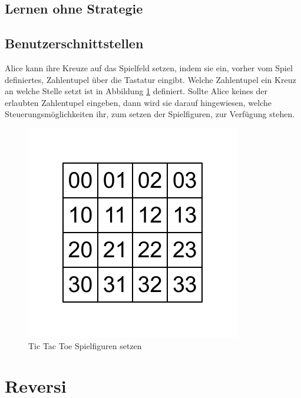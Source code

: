 


\subsection{Lernen ohne Strategie}
\label{subsec:Lernen ohne Strategie}

\subsection{Benutzerschnittstellen}

Alice kann ihre Kreuze auf das Spielfeld setzen, indem sie ein, vorher vom Spiel definiertes, Zahlentupel über die Tastatur eingibt. Welche Zahlentupel ein Kreuz an welche Stelle setzt ist in Abbildung \ref{fig:kreiseUndKreuzeSetzen} definiert. Sollte Alice keines der erlaubten Zahlentupel eingeben, dann wird sie darauf hingewiesen, welche Steuerungsmöglichkeiten ihr, zum setzen der Spielfiguren, zur Verfügung stehen.

\begin{figure}[!htbp]
  \centering
  \includegraphics[scale = 1]{inhalt/abbildungen/vier_mal_vier_matrix.pdf}
  \caption{Tic Tac Toe Spielfiguren setzen}
  \label{fig:kreiseUndKreuzeSetzen}
\end{figure}

\section{Reversi}

